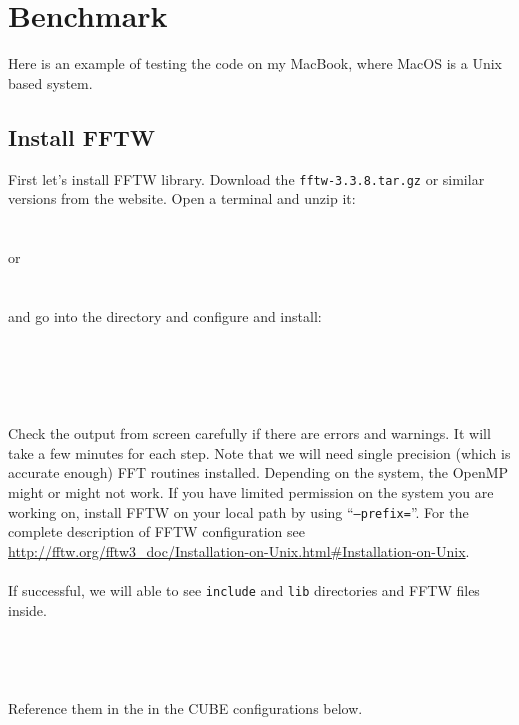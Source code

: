 \documentclass[12pt]{article}
\begin{document}
\section{Benchmark}

Here is an example of testing the code on my MacBook, where MacOS is a Unix based system. 

\subsection{Install FFTW}
First let's install FFTW library. Download the {\tt fftw-3.3.8.tar.gz} or similar versions from the website.
Open a terminal and unzip it:
\\\\
 \\
or\\
\\
\\
and go into the directory and configure and install:
\\\\
\\
\\
\\
\\
Check the output from screen carefully if there are errors and warnings. It will take a few minutes for each step. Note that we will need single precision (which is accurate enough) FFT routines installed. Depending on the system, the OpenMP might or might not work. If you have limited permission on the system you are working on, install FFTW on your local path by using ``{\tt --prefix=}''. For the complete description of FFTW configuration see \url{http://fftw.org/fftw3_doc/Installation-on-Unix.html#Installation-on-Unix}.
\\\\
If successful, we will able to see {\tt include} and {\tt lib} directories and FFTW files inside.
\\\\
 \\
 \\
\\
Reference them in the in the CUBE configurations below.
\end{document}
